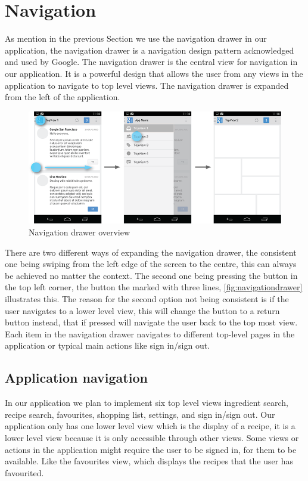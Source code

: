 \section{Navigation}\label{sec:navigation}
As mention in the previous Section we use the navigation drawer in our application, the navigation drawer is a navigation design pattern acknowledged and used by Google.\cite{guidelines-navigationdrawer} The navigation drawer is the central view for navigation in our application. It is a powerful design that allows the user from any views in the application to navigate to top level views. The navigation drawer is expanded from the left of the application.
\begin{figure}[H]
\centering
\includegraphics[width=0.9\linewidth]{img/screenshots/navigation_drawer_overview.png}
\caption{Navigation drawer overview \cite{guidelines-navigationdrawer}}
\label{fig:navigationdrawer}
\end{figure}
There are two different ways of expanding the navigation drawer, the consistent one being swiping from the left edge of the screen to the centre, this can always be achieved no matter the context. 
The second one being pressing the button in the top left corner, the button the marked with three lines, \autoref{fig:navigationdrawer} illustrates this. 
The reason for the second option not being consistent is if the user navigates to a lower level view, this will change the button to a return button instead, that if pressed will navigate the user back to the top most view. 
Each item in the navigation drawer navigates to different top-level pages in the application or typical main actions like sign in/sign out.

\subsection{Application navigation}
In our application we plan to implement six top level views ingredient search, recipe search, favourites, shopping list, settings, and sign in/sign out. 
Our application only has one lower level view which is the display of a recipe, it is a lower level view because it is only accessible through other views.
Some views or actions in the application might require the user to be signed in, for them to be available. 
Like the favourites view, which displays the recipes that the user has favourited. 

